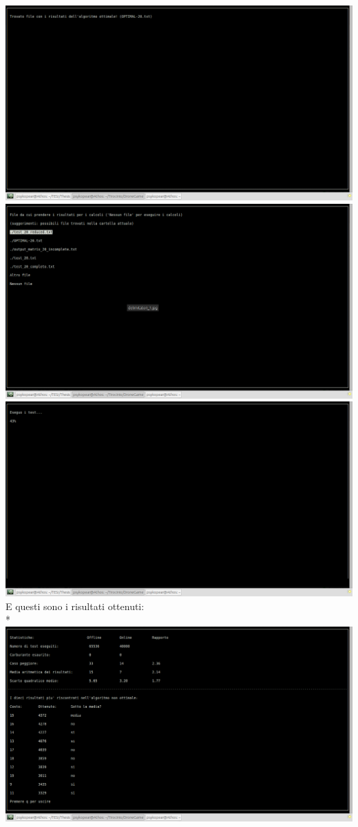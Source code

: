 \includegraphics[width=\textwidth]{immagini/test2.png}
\includegraphics[width=\textwidth]{immagini/test3.png}
\includegraphics[width=\textwidth]{immagini/test5.png}
E questi sono i risultati ottenuti:\\*
\includegraphics[width=\textwidth]{immagini/Results.png}